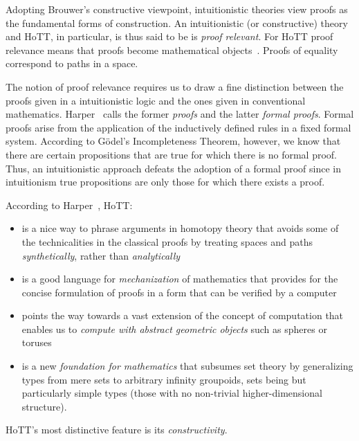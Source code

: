 \documentclass[12pt]{article}
\begin{document}
Adopting Brouwer's constructive viewpoint, intuitionistic theories view proofs as the
fundamental forms of construction.  An intuitionistic (or constructive) theory and \gls{HoTT},
in particular, is thus said to be is \emph{proof relevant}.  For \gls{HoTT} proof relevance
means that proofs become mathematical objects~\cite{Harper2013}.  Proofs of equality correspond
to paths in a space.

The notion of proof relevance requires us to draw a fine distinction between the proofs given
in a intuitionistic logic and the ones given in conventional mathematics.
Harper~\cite{Harper2012} calls the former \emph{proofs} and the latter \emph{formal
  proofs}.  Formal proofs arise from the application of the inductively defined rules in a
fixed formal system.  According to G\"{o}del's Incompleteness Theorem, however, we know that
there are certain propositions that are true for which there is no formal proof.  Thus, an
intuitionistic approach defeats the adoption of a formal proof since in intuitionism true
propositions are only those for which there exists a proof.

According to Harper~\cite{Harper2013a,Harper2013}, HoTT:

\begin{itemize}

\item is a nice way to phrase arguments in homotopy theory that avoids some of the technicalities
  in the classical proofs by treating spaces and paths \emph{synthetically}, rather than
  \emph{analytically}

\item is a good language for \emph{mechanization} of mathematics that provides for the concise
  formulation of proofs in a form that can be verified by a computer

\item points the way towards a vast extension of the concept of computation that enables us to
  \emph{compute with abstract geometric objects} such as spheres or toruses

\item is a new \emph{foundation for mathematics} that subsumes set theory by generalizing
  types from mere sets to arbitrary infinity groupoids, sets being but particularly simple
  types (those with no non-trivial higher-dimensional structure).

\end{itemize}

HoTT's most distinctive feature is its \emph{constructivity}.
\end{document}
